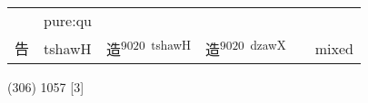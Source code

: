 \documentclass[14pt,a4paper]{scrartcl}
\begin{document}
\begin{longtable}[c]{@{}llllll@{}}
\begin{minipage}[t]{0.14\columnwidth}\raggedright\strut
\strut\end{minipage} &
\begin{minipage}[t]{0.14\columnwidth}\raggedright\strut
pure:qu
\strut\end{minipage}\tabularnewline
\begin{minipage}[t]{0.14\columnwidth}\raggedright\strut
告
\strut\end{minipage} &
\begin{minipage}[t]{0.14\columnwidth}\raggedright\strut
tshawH
\strut\end{minipage} &
\begin{minipage}[t]{0.14\columnwidth}\raggedright\strut
造\textsuperscript{9020~tshawH}
\strut\end{minipage} &
\begin{minipage}[t]{0.14\columnwidth}\raggedright\strut
造\textsuperscript{9020~dzawX}
\strut\end{minipage} &
\begin{minipage}[t]{0.14\columnwidth}\raggedright\strut
\strut\end{minipage} &
\begin{minipage}[t]{0.14\columnwidth}\raggedright\strut
mixed
\strut\end{minipage}\tabularnewline
\bottomrule
\end{longtable}

(306) 1057 {[}3{]}
\end{document}
